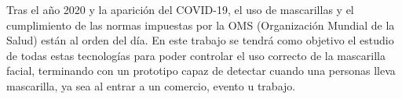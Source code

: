 Tras el año 2020 y la aparición del COVID-19, el uso de mascarillas y el cumplimiento de las normas impuestas por la OMS (Organización Mundial de la Salud) están al orden del día. En este trabajo se tendrá como objetivo el estudio de todas estas tecnologías para poder controlar el uso correcto de la mascarilla facial, terminando con un prototipo capaz de detectar cuando una personas lleva mascarilla, ya sea al entrar a un comercio, evento u trabajo.


